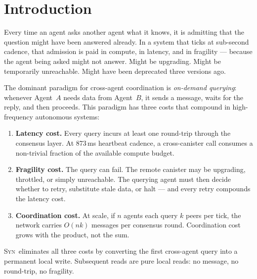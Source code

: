 \documentclass[11pt,a4paper]{article}
\newcommand{\SYN}{\textsc{Syn}}
\begin{document}
\begin{abstract}
The result is an agent architecture that is \emph{self-bootstrapping},
\emph{self-healing}, and \emph{self-governing}: one initialisation call, and
then it runs.  We discuss the coordination patterns this unlocks for AI agent
networks that cannot afford the overhead of on-demand querying at scale.
\end{abstract}

\section{Introduction}
\label{sec:intro}

Every time an agent asks another agent what it knows, it is admitting that
the question might have been answered already.  In a system that ticks at
sub-second cadence, that admission is paid in compute, in latency, and in
fragility --- because the agent being asked might not answer.  Might be
upgrading.  Might be temporarily unreachable.  Might have been deprecated
three versions ago.

The dominant paradigm for cross-agent coordination is \emph{on-demand querying}:
whenever Agent~$A$ needs data from Agent~$B$, it sends a message, waits for
the reply, and then proceeds.  This paradigm has three costs that compound in
high-frequency autonomous systems:

\begin{enumerate}[label=(\arabic*)]
  \item \textbf{Latency cost.}  Every query incurs at least one round-trip
        through the consensus layer.  At 873\,ms heartbeat cadence, a
        cross-canister call consumes a non-trivial fraction of the available
        compute budget.

  \item \textbf{Fragility cost.}  The query can fail.  The remote canister may
        be upgrading, throttled, or simply unreachable.  The querying agent must
        then decide whether to retry, substitute stale data, or halt --- and
        every retry compounds the latency cost.

  \item \textbf{Coordination cost.}  At scale, if $n$ agents each query $k$
        peers per tick, the network carries $O(nk)$ messages per consensus
        round.  Coordination cost grows with the product, not the sum.
\end{enumerate}

\SYN\ eliminates all three costs by converting the first cross-agent query into
a permanent local write.  Subsequent reads are pure local reads: no message,
no round-trip, no fragility.
\end{document}
